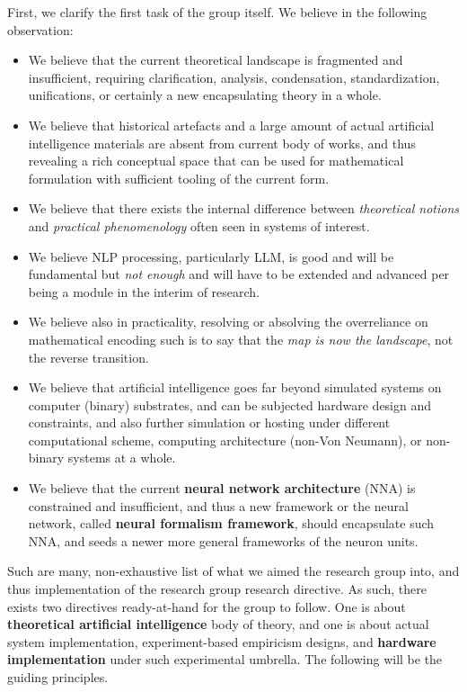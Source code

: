 \documentclass[9pt,a4paper]{article}
\begin{document}
First, we clarify the first task of the group itself. We believe in the following observation:
\begin{itemize}[topsep=1pt,itemsep=1pt]
    \item We believe that the current theoretical landscape is fragmented and insufficient, requiring clarification, analysis, condensation, standardization, unifications, or certainly a new encapsulating theory in a whole. 
    \item We believe that historical artefacts and a large amount of actual artificial intelligence materials are absent from current body of works, and thus revealing a rich conceptual space that can be used for mathematical formulation with sufficient tooling of the current form. 
    \item We believe that there exists the internal difference between \textit{theoretical notions} and \textit{practical phenomenology} often seen in systems of interest. 
    \item We believe NLP processing, particularly LLM, is good and will be fundamental but \textit{not enough} and will have to be extended and advanced per being a module in the interim of research. 
    \item We believe also in practicality, resolving or absolving the overreliance on mathematical encoding such is to say that the \textit{map is now the landscape}, not the reverse transition. 
    \item We believe that artificial intelligence goes far beyond simulated systems on computer (binary) substrates, and can be subjected hardware design and constraints, and also further simulation or hosting under different computational scheme, computing architecture (non-Von Neumann), or non-binary systems at a whole. 
    \item We believe that the current \textbf{neural network architecture} (NNA) is constrained and insufficient, and thus a new framework or the neural network, called \textbf{neural formalism framework}, should encapsulate such NNA, and seeds a newer more general frameworks of the neuron units. 
\end{itemize}
Such are many, non-exhaustive list of what we aimed the research group into, and thus implementation of the research group research directive. As such, there exists two directives ready-at-hand for the group to follow. One is about \textbf{theoretical artificial intelligence} body of theory, and one is about actual system implementation, experiment-based empiricism designs, and \textbf{hardware implementation} under such experimental umbrella. The following will be the guiding principles. 
\end{document}
